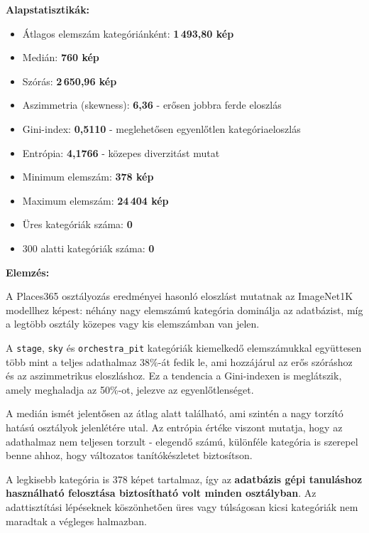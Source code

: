         \vspace{1em}
        \textbf{Alapstatisztikák:}

        \begin{itemize}
        \item Átlagos elemszám kategóriánként: \textbf{1\,493,80 kép}
        \item Medián: \textbf{760 kép}
        \item Szórás: \textbf{2\,650,96 kép}
        \item Aszimmetria (skewness): \textbf{6,36} - erősen jobbra ferde eloszlás
        \item Gini-index: \textbf{0,5110} - meglehetősen egyenlőtlen kategóriaeloszlás
        \item Entrópia: \textbf{4,1766} - közepes diverzitást mutat
        \item Minimum elemszám: \textbf{378 kép}
        \item Maximum elemszám: \textbf{24\,404 kép}
        \item Üres kategóriák száma: \textbf{0}
        \item 300 alatti kategóriák száma: \textbf{0}
        \end{itemize}

        \vspace{1em}
        \textbf{Elemzés:}

        A Places365 osztályozás eredményei hasonló eloszlást mutatnak az ImageNet1K modellhez képest: néhány nagy elemszámú kategória dominálja az adatbázist, míg a legtöbb osztály közepes vagy kis elemszámban van jelen.

        A \texttt{stage}, \texttt{sky} és \texttt{orchestra\_pit} kategóriák kiemelkedő elemszámukkal együttesen több mint a teljes adathalmaz 38\%-át fedik le, ami hozzájárul az erős szóráshoz és az aszimmetrikus eloszláshoz. Ez a tendencia a Gini-indexen is meglátszik, amely meghaladja az 50\%-ot, jelezve az egyenlőtlenséget.

        A medián ismét jelentősen az átlag alatt található, ami szintén a nagy torzító hatású osztályok jelenlétére utal. Az entrópia értéke viszont mutatja, hogy az adathalmaz nem teljesen torzult - elegendő számú, különféle kategória is szerepel benne ahhoz, hogy változatos tanítókészletet biztosítson.

        A legkisebb kategória is 378 képet tartalmaz, így az \textbf{adatbázis gépi tanuláshoz használható felosztása biztosítható volt minden osztályban}. Az adattisztítási lépéseknek köszönhetően üres vagy túlságosan kicsi kategóriák nem maradtak a végleges halmazban.

